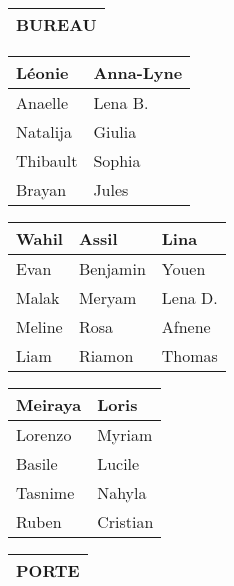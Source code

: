 \documentclass[a4paper, 20pt]{extarticle}
\begin{document}

\begin{center}
	\begin{tabular}{|P{.35\textwidth}|}\hline
		BUREAU \\ \hline
	\end{tabular}
\end{center}
\vfill
\begin{center}
	\begin{tabular}{|P{.1\textwidth}|P{.15\textwidth}|}\hline
	Léonie & Anna-Lyne  \\ \hline
	Anaelle & Lena B. \\ \hline
	Natalija & Giulia \\ \hline
	Thibault & Sophia \\ \hline
	Brayan & Jules  \\ \hline
	\end{tabular}
	\hfill
	\begin{tabular}{|P{.12\textwidth}|P{.11\textwidth}|P{.11\textwidth}|}\hline
	Wahil & Assil & Lina \\ \hline
	Evan & Benjamin & Youen \\ \hline
	Malak & Meryam & Lena D. \\ \hline
	Meline & Rosa & Afnene \\ \hline
	Liam & Riamon & Thomas \\ \hline
	\end{tabular}
	\hfill
	\begin{tabular}{|P{.1\textwidth}|P{.1\textwidth}|}\hline
	Meiraya & Loris \\ \hline
	Lorenzo & Myriam \\ \hline
	Basile & Lucile \\ \hline
	Tasnime & Nahyla \\ \hline
	Ruben & Cristian \\ \hline
	\end{tabular}
\end{center}

\hfill
\begin{tabular}{|P{.1\textwidth}|}\hline
	PORTE \\ \hline
\end{tabular}
\end{document}
